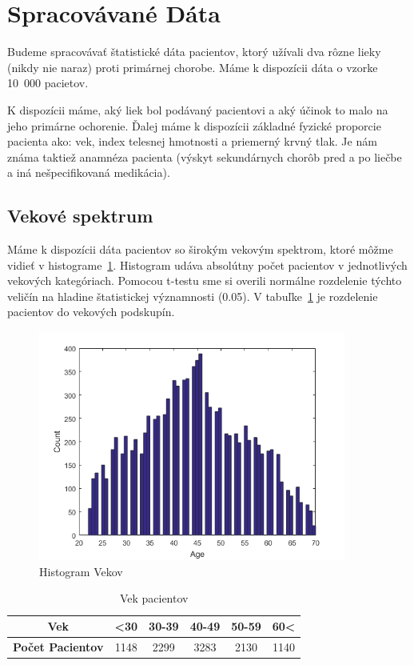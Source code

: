 \section{Spracovávané Dáta}

Budeme spracovávať štatistické dáta pacientov, ktorý užívali dva rôzne lieky (nikdy nie naraz) proti primárnej chorobe. Máme k dispozícii dáta o vzorke 10~000 pacietov.


K dispozícii máme, aký liek bol podávaný pacientovi a aký účinok to malo na jeho primárne ochorenie. Ďalej máme k dispozícii základné fyzické proporcie pacienta ako: vek, index telesnej hmotnosti a priemerný krvný tlak. Je nám známa taktiež anamnéza pacienta (výskyt sekundárnych chorôb pred a po liečbe a iná nešpecifikovaná medikácia).

\subsection{Vekové spektrum}

Máme k dispozícii dáta pacientov so širokým vekovým spektrom, ktoré môžme vidieť v histograme~\ref{fig:hist-vek}. Histogram udáva absolútny počet pacientov v jednotlivých vekových kategóriach. Pomocou t-testu sme si overili normálne rozdelenie týchto veličín na hladine štatistickej významnosti (0.05). V tabuľke~\ref{tab:vek} je rozdelenie pacientov do vekových podskupín.

\begin{figure}[h!]
	\centering
  		\includegraphics[width=0.9\textwidth]{ages.png}
  	\caption{Histogram Vekov}
  	\label{fig:hist-vek}
\end{figure}

\begin{table}[h!]
\centering
\begin{tabular}{c|ccccc}
\hline
\textbf{Vek}             & \textless 30 & 30-39 & 40-49 & 50-59 & 60\textless \\ \hline
\textbf{Počet Pacientov} & 1148 & 2299  & 3283  & 2130  & 1140 \\ \hline
\end{tabular}
\caption{Vek pacientov}
\label{tab:vek}
\end{table}


